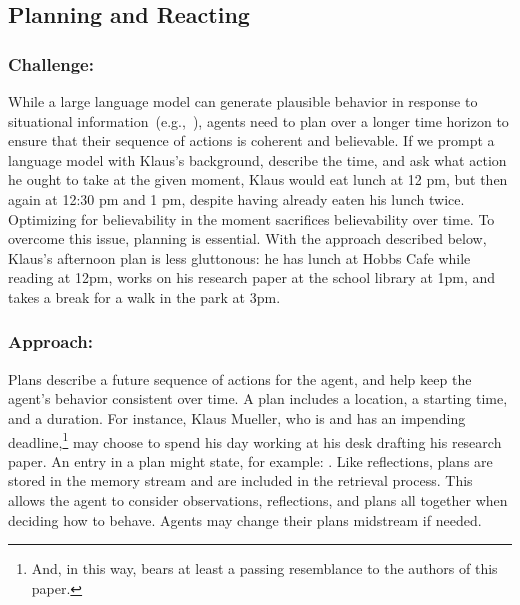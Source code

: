 \subsection{Planning and Reacting}

\subsubsection*{Challenge:}
While a large language model can generate plausible behavior in response to situational information~(e.g.,~\cite{9_park2022socialsimulacra,63_horton2023large}), agents need to plan over a longer time horizon to ensure that their sequence of actions is coherent and believable. If we prompt a language model with Klaus's background, describe the time, and ask what action he ought to take at the given moment, Klaus would eat lunch at 12 pm, but then again at 12:30 pm and 1 pm, despite having already eaten his lunch twice. Optimizing for believability in the moment sacrifices believability over time. To overcome this issue, planning is essential. With the approach described below, Klaus's afternoon plan is less gluttonous: he has lunch at Hobbs Cafe while reading at 12pm, works on his research paper at the school library at 1pm, and takes a break for a walk in the park at 3pm.

\subsubsection*{Approach:}
Plans describe a future sequence of actions for the agent, and help keep the agent's behavior consistent over time. A plan includes a location, a starting time, and a duration. For instance, Klaus Mueller, who is  and has an impending deadline,\footnote{And, in this way, bears at least a passing resemblance to the authors of this paper.} may choose to spend his day working at his desk drafting his research paper. An entry in a plan might state, for example: . Like reflections, plans are stored in the memory stream and are included in the retrieval process. This allows the agent to consider observations, reflections, and plans all together when deciding how to behave. Agents may change their plans midstream if needed.

